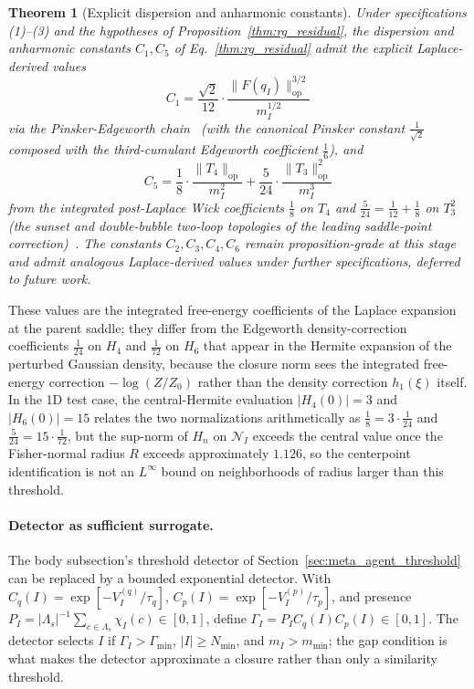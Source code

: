\documentclass[11pt]{article}
\newtheorem{theorem}{Theorem}
\begin{document}
\begin{theorem}[Explicit dispersion and anharmonic constants]
\label{thm:rg_residual_explicit}
Under specifications (1)--(3) and the hypotheses of Proposition~\ref{thm:rg_residual}, the dispersion and anharmonic constants $C_1, C_5$ of Eq.~\eqref{thm:rg_residual} admit the explicit Laplace-derived values
\begin{equation}
C_1 = \frac{\sqrt 2}{12} \cdot \frac{\|F(q_I)\|_{\mathrm{op}}^{3/2}}{m_I^{1/2}}
\label{eq:rg_C1_explicit}
\end{equation}
via the Pinsker-Edgeworth chain~\cite{CoverThomas2006} (with the canonical Pinsker constant $\tfrac{1}{\sqrt 2}$ composed with the third-cumulant Edgeworth coefficient $\tfrac{1}{6}$), and
\begin{equation}
C_5 = \frac{1}{8} \cdot \frac{\|T_4\|_{\mathrm{op}}}{m_I^2} + \frac{5}{24} \cdot \frac{\|T_3\|_{\mathrm{op}}^2}{m_I^3}
\label{eq:rg_C5_explicit}
\end{equation}
from the integrated post-Laplace Wick coefficients $\tfrac{1}{8}$ on $T_4$ and $\tfrac{5}{24} = \tfrac{1}{12} + \tfrac{1}{8}$ on $T_3^2$ (the sunset and double-bubble two-loop topologies of the leading saddle-point correction)~\cite{BenderOrszag1999, wong2001asymptotic}. The constants $C_2, C_3, C_4, C_6$ remain proposition-grade at this stage and admit analogous Laplace-derived values under further specifications, deferred to future work.
\end{theorem}

These values are the integrated free-energy coefficients of the Laplace expansion at the parent saddle; they differ from the Edgeworth density-correction coefficients $\tfrac{1}{24}$ on $H_4$ and $\tfrac{1}{72}$ on $H_6$ that appear in the Hermite expansion of the perturbed Gaussian density, because the closure norm sees the integrated free-energy correction $-\log(Z/Z_0)$ rather than the density correction $h_1(\xi)$ itself. In the 1D test case, the central-Hermite evaluation $|H_4(0)| = 3$ and $|H_6(0)| = 15$ relates the two normalizations arithmetically as $\tfrac{1}{8} = 3 \cdot \tfrac{1}{24}$ and $\tfrac{5}{24} = 15 \cdot \tfrac{1}{72}$, but the sup-norm of $H_n$ on $\mathcal{N}_I$ exceeds the central value once the Fisher-normal radius $R$ exceeds approximately $1.126$, so the centerpoint identification is not an $L^\infty$ bound on neighborhoods of radius larger than this threshold.

\paragraph{Detector as sufficient surrogate.}
The body subsection's threshold detector of Section~\ref{sec:meta_agent_threshold} can be replaced by a bounded exponential detector. With $C_q(I) = \exp[-V_I^{(q)}/\tau_q]$, $C_p(I) = \exp[-V_I^{(p)}/\tau_p]$, and presence $P_I = |\Lambda_s|^{-1}\sum_{c \in \Lambda_s}\chi_I(c) \in [0, 1]$, define $\Gamma_I = P_I C_q(I) C_p(I) \in [0, 1]$. The detector selects $I$ if $\Gamma_I > \Gamma_{\min}$, $|I| \ge N_{\min}$, and $m_I > m_{\min}$; the gap condition is what makes the detector approximate a closure rather than only a similarity threshold.
\end{document}

